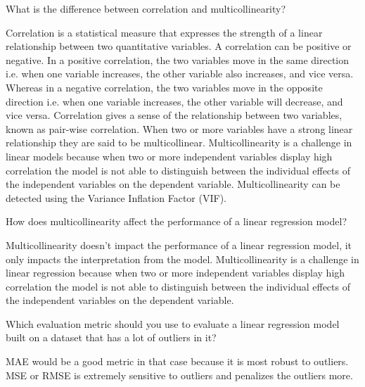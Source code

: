 	\begin{qanda}
		\begin{question}
What is the difference between correlation and multicollinearity?
		\end{question}
		\begin{answer}
Correlation is a statistical measure that expresses the strength of a linear relationship between two quantitative variables. A correlation can be positive or negative. In a positive correlation, the two variables move in the same direction i.e. when one variable increases, the other variable also increases, and vice versa. Whereas in a negative correlation, the two variables move in the opposite direction i.e. when one variable increases, the other variable will decrease, and vice versa. Correlation gives a sense of the relationship between two variables, known as pair-wise correlation. When two or more variables have a strong linear relationship they are said to be multicollinear. Multicollinearity is a challenge in linear models because when two or more independent variables display high correlation the model is not able to distinguish between the individual effects of the independent variables on the dependent variable. Multicollinearity can be detected using the Variance Inflation Factor (VIF).
		\end{answer}
	\end{qanda}

	\begin{qanda}
		\begin{question}
How does multicollinearity affect the performance of a linear regression model?
		\end{question}
		\begin{answer}
Multicollinearity doesn't impact the performance of a linear regression model, it only impacts the interpretation from the model.  Multicollinearity is a challenge in linear regression because when two or more independent variables display high correlation the model is not able to distinguish between the individual effects of the independent variables on the dependent variable.
		\end{answer}
	\end{qanda}

	\begin{qanda}
		\begin{question}
Which evaluation metric should you use to evaluate a linear regression model built on a dataset that has a lot of outliers in it?
		\end{question}
		\begin{answer}
MAE would be a good metric in that case because it is most robust to outliers. MSE or RMSE is extremely sensitive to outliers and penalizes the outliers more.
		\end{answer}
	\end{qanda}

